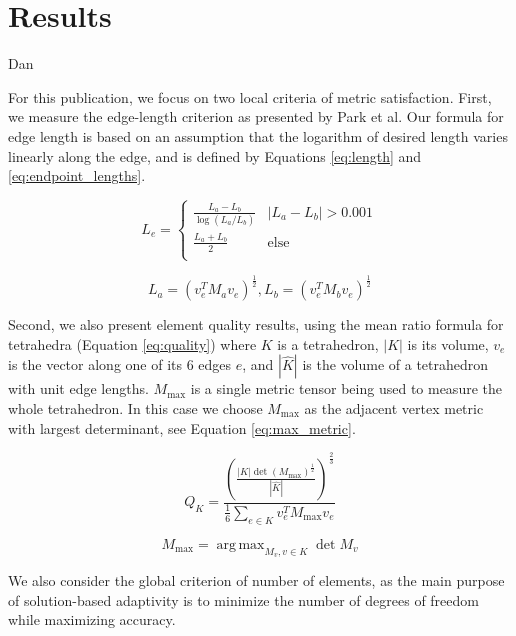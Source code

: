\documentclass[3p,times,procedia,number]{elsarticle}
\DeclareMathOperator*{\argmax}{arg\,max}
\begin{document}
\section{Results}
{\color{red} Dan}

For this publication, we focus on two local criteria of metric
satisfaction.
First, we measure the edge-length criterion as presented
by Park et al.\cite{park-loseille-krakos-michal-adapt-decomposition}
Our formula for edge length is based on an assumption
that the logarithm of desired length varies linearly along the
edge,\cite{alauzet-fead-2010-size-gradation-aniso} and is defined
by Equations \ref{eq:length} and \ref{eq:endpoint_lengths}.

\begin{equation}
\label{eq:length}
L_e = \begin{cases}
\frac{L_a - L_b}{\log(L_a / L_b)} & |L_a - L_b| > 0.001 \\
\frac{L_a + L_b}{2} & \text{else} \\
\end{cases}
\end{equation}

\begin{equation}
\label{eq:endpoint_lengths}
L_a = (v_e^T M_a v_e)^{\frac12},
L_b = (v_e^T M_b v_e)^{\frac12}
\end{equation}

Second, we also present element quality results, using the
mean ratio formula for tetrahedra (Equation \ref{eq:quality})
where $K$ is a tetrahedron, $|K|$ is its volume,
$v_e$ is the vector along one of its 6 edges $e$,
and $|\hat{K}|$ is the volume of a tetrahedron
with unit edge lengths.
$M_{\text{max}}$ is a single metric tensor
being used to measure the whole tetrahedron.
In this case we choose $M_{\text{max}}$ as the
adjacent vertex metric with largest determinant,
see Equation \ref{eq:max_metric}.

\begin{equation}
\label{eq:quality}
Q_K =
 \frac{\left(\frac{|K|\det(M_{\text{max}})^{\frac12}}
                  {|\hat{K}|}
       \right)^{\frac{2}{3}}}
      {\frac16\sum_{e\in K}{v_e^T M_{\text{max}} v_e}}
\end{equation}

\begin{equation}
\label{eq:max_metric}
M_{\text{max}} = \argmax_{M_v, v\in K}{\det{M_v}}
\end{equation}

We also consider the global criterion of number of elements,
as the main purpose of solution-based adaptivity is to
minimize the number of degrees of freedom while maximizing
accuracy.
\end{document}
